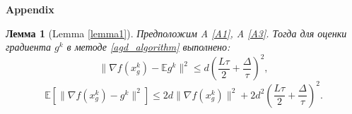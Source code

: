\documentclass{article}
\newtheorem{lemma}{Лемма}
\begin{document}
\newpage
\appendix
\begin{center}
    \LARGE \textbf{Appendix}\label{appendix}
\end{center}
\normalsize
\begin{lemma}[Lemma \ref{lemma1}]\label{lemma1_appendix}
 Предположим A \ref{A1}, A \ref{A3}. Тогда для оценки градиента $g^k$ в методе \ref{agd_algorithm} выполнено:
 \begin{equation}
  \|\nabla f(x_g^k) - \mathbb{E}g^k\|^2 \leqslant d \left(\frac{L\tau}{2} + \frac{\Delta}{\tau}\right)^2,
  \label{norm_of_expectation_appendix}
 \end{equation}
 \begin{equation}
  \mathbb{E}[\|\nabla f(x_g^k) - g^k\|^2] \leqslant 2d \|\nabla f(x_g^k)\|^2 + 2 d^2 \left(\frac{L\tau}{2} + \frac{\Delta}{\tau}\right)^2.
  \label{expectation_of_norm_appendix}
 \end{equation}
\end{lemma}
\end{document}
